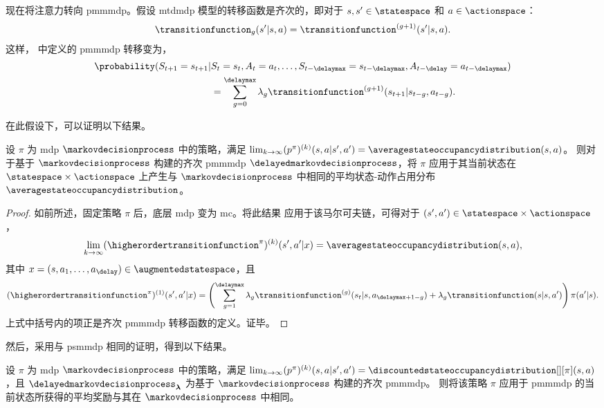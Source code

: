 现在将注意力转向 \gls{pmmmdp}。假设 \gls{mtdmdp} 模型的转移函数是齐次的，即对于 $s,s'\in\statespace$ 和 $a\in\actionspace$：
\begin{align*}
    \transitionfunction_g(s'\vert s,a)=\transitionfunction^{(g+1)}(s'\vert s,a).
\end{align*}
这样， 中定义的 \gls{pmmmdp} 转移变为，
\begin{align*}
    \probability(S_{t+1}=s_{t+1}\vert& S_{t}=s_{t},A_{t}=a_{t},\dots,S_{t-\delaymax}=s_{t-\delaymax},A_{t-\delay}=a_{t-\delaymax})
    \\
    &= \sum_{g=0}^\delaymax \lambda_g \transitionfunction^{(g+1)}(s_{t+1}\vert s_{t-g},a_{t-g}).
\end{align*}

在此假设下，可以证明以下结果。
\begin{lemma}
\label{lem:same_distrib_pmmmdp}
    设 $\pi$ 为 \gls{mdp} $\markovdecisionprocess$ 中的策略，满足 $\textstyle\lim_{k\rightarrow\infty}(p^\pi)^{(k)}(s,a\vert s',a')= \averagestateoccupancydistribution(s,a)$。
    则对于基于 $\markovdecisionprocess$ 构建的齐次 \gls{pmmmdp} $\delayedmarkovdecisionprocess$，将 $\pi$ 应用于其当前状态在 $\statespace\times\actionspace$ 上产生与 $\markovdecisionprocess$ 中相同的平均状态-动作占用分布 $\averagestateoccupancydistribution$。
\end{lemma}
\begin{proof}
    如前所述，固定策略 $\pi$ 后，底层 \gls{mdp} 变为 \gls{mc}。将此结果 \cite[Proposition~4]{berchtold1996modelisation} 应用于该马尔可夫链，可得对于 $(s',a')\in\statespace\times\actionspace$，
    \begin{align*}
        \lim_{k\rightarrow\infty}(\higherordertransitionfunction^\pi)^{(k)}(s',a' \vert x) = \averagestateoccupancydistribution(s,a),
    \end{align*}
    其中 $x=(s,a_1,\dots,a_\delay)\in\augmentedstatespace$，且
    \begin{align*}
        (\higherordertransitionfunction^\pi)^{(1)}(s',a' \vert x)= \left(\sum_{g=1}^{\delaymax} \lambda_g \transitionfunction^{(g)}(s_t\vert s,a_{\delaymax+1-g}) + \lambda_g \transitionfunction(s\vert s,a')\right)\pi(a'\vert s).
    \end{align*}
    上式中括号内的项正是齐次 \gls{pmmmdp} 转移函数的定义。证毕。
\end{proof}
然后，采用与 \gls{psmmdp} 相同的证明，得到以下结果。
\begin{thm}
\label{th:pmmmdp_same}
    设 $\pi$ 为 \gls{mdp} $\markovdecisionprocess$ 中的策略，满足 $\lim_{k\rightarrow\infty}(p^\pi)^{(k)}(s,a\vert s',a')= \discountedstateoccupancydistribution[][\pi](s,a)$，且 $\delayedmarkovdecisionprocess_{\boldsymbol{\lambda}}$ 为基于 $\markovdecisionprocess$ 构建的齐次 \gls{pmmmdp}。
    则将该策略 $\pi$ 应用于 \gls{pmmmdp} 的当前状态所获得的平均奖励与其在 $\markovdecisionprocess$ 中相同。
\end{thm}


